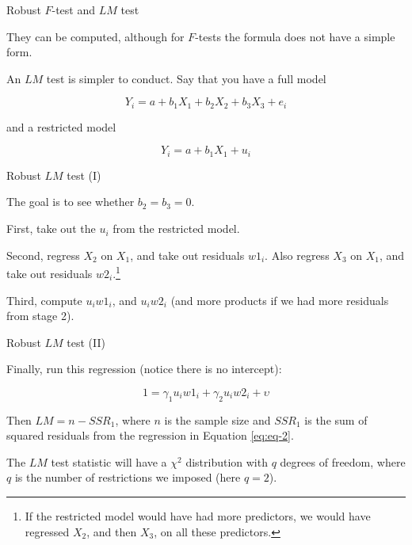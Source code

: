 \documentclass[12pt,english,pdf,xcolor=dvipsnames,aspectratio=169,handout]{beamer}\usepackage[]{graphicx}\usepackage[]{xcolor}
\begin{document}
\begin{frame}{Robust $F$-test and $LM$ test}

They can be computed, although for $F$-tests the formula does not have a simple form.\bigskip

An $LM$ test is simpler to conduct. Say that you have a full model

\begin{equation}
  Y_i = a + b_1X_1 + b_2X_2 + b_3X_3 + e_i
\end{equation}

and a restricted model

\begin{equation}
  Y_i = a + b_1X_1 + u_i
\end{equation}

\end{frame}



\begin{frame}{Robust $LM$ test (I)}

  The goal is to see whether $b_2=b_3=0$.\bigskip

  First, take out the $u_i$ from the restricted model.\bigskip

  Second, regress $X_2$ on $X_1$, and take out residuals $w1_i$. Also regress $X_3$ on $X_1$, and take out residuals $w2_i$.\footnote{If the restricted model would have had more predictors, we would have regressed $X_2$, and then $X_3$, on all these predictors.}\bigskip

  Third, compute $u_iw1_i$, and $u_iw2_i$ (and more products if we had more residuals from stage 2).

\end{frame}


\begin{frame}{Robust $LM$ test (II)}

  Finally, run this regression (notice there is no intercept):

\begin{equation}
  1 = \gamma_1u_iw1_i + \gamma_2u_iw2_i + \upsilon
\label{eq:eq-2}
\end{equation}  

Then $LM = n - SSR_1$, where $n$ is the sample size and $SSR_1$ is the sum of squared residuals from the regression in Equation \ref{eq:eq-2}.\bigskip

The $LM$ test statistic will have a $\chi^2$ distribution with $q$ degrees of freedom, where $q$ is the number of restrictions we imposed (here $q=2$).

\end{frame}
\end{document}
